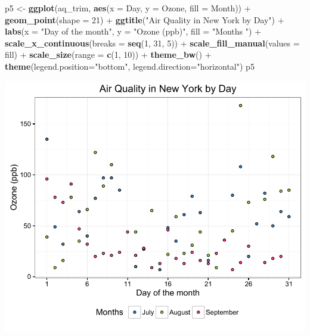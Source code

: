 \documentclass[]{article}
\newenvironment{Shaded}{\begin{snugshade}}{\end{snugshade}}
\newcommand{\KeywordTok}[1]{\textcolor[rgb]{0.13,0.29,0.53}{\textbf{{#1}}}}
\newcommand{\DataTypeTok}[1]{\textcolor[rgb]{0.13,0.29,0.53}{{#1}}}
\newcommand{\DecValTok}[1]{\textcolor[rgb]{0.00,0.00,0.81}{{#1}}}
\newcommand{\StringTok}[1]{\textcolor[rgb]{0.31,0.60,0.02}{{#1}}}
\newcommand{\NormalTok}[1]{{#1}}
\begin{document}
\begin{Shaded}
\begin{Highlighting}[]
\NormalTok{p5 <-}\StringTok{ }\KeywordTok{ggplot}\NormalTok{(aq_trim, }\KeywordTok{aes}\NormalTok{(}\DataTypeTok{x =} \NormalTok{Day, }\DataTypeTok{y =} \NormalTok{Ozone, }\DataTypeTok{fill =} \NormalTok{Month)) +}
\StringTok{  }\KeywordTok{geom_point}\NormalTok{(}\DataTypeTok{shape =} \DecValTok{21}\NormalTok{) +}
\StringTok{  }\KeywordTok{ggtitle}\NormalTok{(}\StringTok{"Air Quality in New York by Day"}\NormalTok{) +}\StringTok{ }
\StringTok{  }\KeywordTok{labs}\NormalTok{(}\DataTypeTok{x =} \StringTok{"Day of the month"}\NormalTok{, }\DataTypeTok{y =} \StringTok{"Ozone (ppb)"}\NormalTok{, }\DataTypeTok{fill =} \StringTok{"Months "}\NormalTok{) +}
\StringTok{  }\KeywordTok{scale_x_continuous}\NormalTok{(}\DataTypeTok{breaks =} \KeywordTok{seq}\NormalTok{(}\DecValTok{1}\NormalTok{, }\DecValTok{31}\NormalTok{, }\DecValTok{5}\NormalTok{)) +}
\StringTok{  }\KeywordTok{scale_fill_manual}\NormalTok{(}\DataTypeTok{values =} \NormalTok{fill) +}
\StringTok{  }\KeywordTok{scale_size}\NormalTok{(}\DataTypeTok{range =} \KeywordTok{c}\NormalTok{(}\DecValTok{1}\NormalTok{, }\DecValTok{10}\NormalTok{)) +}
\StringTok{  }\KeywordTok{theme_bw}\NormalTok{() +}
\StringTok{  }\KeywordTok{theme}\NormalTok{(}\DataTypeTok{legend.position=}\StringTok{"bottom"}\NormalTok{, }\DataTypeTok{legend.direction=}\StringTok{"horizontal"}\NormalTok{)}
\NormalTok{p5}
\end{Highlighting}
\end{Shaded}

\begin{center}\includegraphics{5_Scatter_Plots_pdf/scatter_12-1} \end{center}
\end{document}

